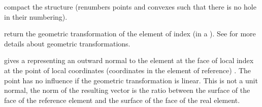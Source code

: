 \documentclass[a4paper,11pt,english]{sphinxmanual}
\begin{document}
\begin{fulllineitems}
\label{\detokenize{userdoc/bmesh:_CPPv4N6getfem4mesh18optimize_structureEv}}%
\pysigstartmultiline
{}%
\pysigstopmultiline
compact the structure (renumbers points and convexes such that there
is no hole in their numbering).

\end{fulllineitems}


\begin{fulllineitems}
\label{\detokenize{userdoc/bmesh:_CPPv4N6getfem4mesh15trans_of_convexE1i}}%
\pysigstartmultiline
{}%
\pysigstopmultiline
return the geometric transformation of the element of index  (in
a ). See  for more details about geometric transformations.

\end{fulllineitems}


\begin{fulllineitems}
\label{\detokenize{userdoc/bmesh:_CPPv4N6getfem4mesh24normal_of_face_of_convexE2ic1f2pt}}%
\pysigstartmultiline
{}%
\pysigstopmultiline
gives a  representing an outward normal
to the element at the face of local index  at the point of local
coordinates (coordinates in the element of reference) . The
point  has no influence if the geometric transformation is
linear. This is not a unit normal, the norm of the resulting vector
is the ratio between the surface of the face of the reference
element and the surface of the face of the real element.

\end{fulllineitems}
\end{document}
